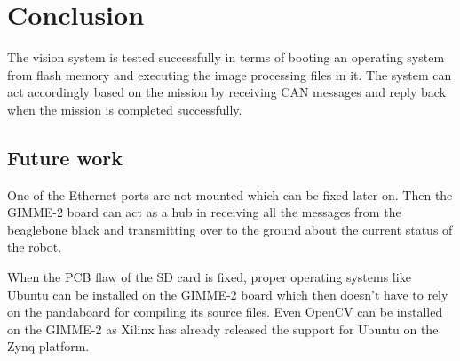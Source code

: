 \section{Conclusion}\label{sec:conclusion}
The vision system is tested successfully in terms of booting an operating system from flash memory and executing the image processing files in it. The system can act accordingly based on the mission by receiving CAN messages and reply back when the mission is completed successfully.


\subsection{Future work}
One of the Ethernet ports are not mounted which can be fixed later on. Then the GIMME-2 board can act as a hub in receiving all the messages from the beaglebone black and transmitting over to the ground about the current status of the robot. 

When the PCB flaw of the SD card is fixed, proper operating systems like Ubuntu can be installed on the GIMME-2 board which then doesn't have to rely on the pandaboard for compiling its source files. Even OpenCV can be installed on the GIMME-2 as Xilinx has already released the support for Ubuntu on the Zynq platform.
